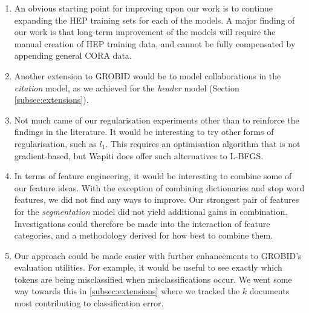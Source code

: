 \begin{enumerate}

\item An obvious starting point for improving upon our work is to continue expanding the HEP training sets for each of the models. A major finding of our work is that long-term improvement of the models will require the manual creation of HEP training data, and cannot be fully compensated by appending general CORA data.

\item Another extension to GROBID would be to model collaborations in the \emph{citation} model, as we achieved for the \emph{header} model (Section \ref{subsec:extensions}).

\item Not much came of our regularisation experiments other than to reinforce the findings in the literature. It would be interesting to try other forms of regularisation, such as $l_1$. This requires an optimisation algorithm that is not gradient-based, but Wapiti does offer such alternatives to L-BFGS.

\item In terms of feature engineering, it would be interesting to combine some of our feature ideas. With the exception of combining dictionaries and stop word features, we did not find any ways to improve. Our strongest pair of features for the \emph{segmentation} model did not yield additional gains in combination. Investigations could therefore be made into the interaction of feature categories, and a methodology derived for how best to combine them.

\item Our approach could be made easier with further enhancements to GROBID's evaluation utilities. For example, it would be useful to see exactly which tokens are being misclassified when misclassifications occur. We went some way towards this in \ref{subsec:extensions} where we tracked the $k$ documents most contributing to classification error.

\end{enumerate}


